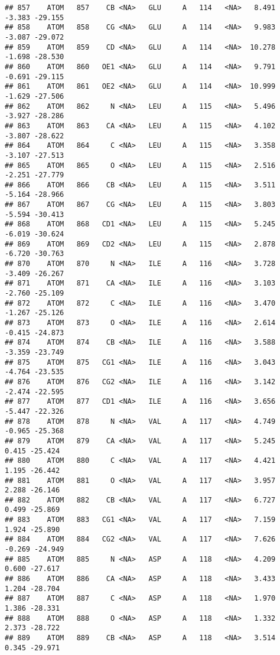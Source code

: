 \documentclass[
]{article}
\begin{document}
\begin{verbatim}
## 857    ATOM   857    CB <NA>   GLU     A   114   <NA>   8.491  -3.383 -29.155
## 858    ATOM   858    CG <NA>   GLU     A   114   <NA>   9.983  -3.087 -29.072
## 859    ATOM   859    CD <NA>   GLU     A   114   <NA>  10.278  -1.698 -28.530
## 860    ATOM   860   OE1 <NA>   GLU     A   114   <NA>   9.791  -0.691 -29.115
## 861    ATOM   861   OE2 <NA>   GLU     A   114   <NA>  10.999  -1.629 -27.506
## 862    ATOM   862     N <NA>   LEU     A   115   <NA>   5.496  -3.927 -28.286
## 863    ATOM   863    CA <NA>   LEU     A   115   <NA>   4.102  -3.807 -28.622
## 864    ATOM   864     C <NA>   LEU     A   115   <NA>   3.358  -3.107 -27.513
## 865    ATOM   865     O <NA>   LEU     A   115   <NA>   2.516  -2.251 -27.779
## 866    ATOM   866    CB <NA>   LEU     A   115   <NA>   3.511  -5.164 -28.966
## 867    ATOM   867    CG <NA>   LEU     A   115   <NA>   3.803  -5.594 -30.413
## 868    ATOM   868   CD1 <NA>   LEU     A   115   <NA>   5.245  -6.019 -30.624
## 869    ATOM   869   CD2 <NA>   LEU     A   115   <NA>   2.878  -6.720 -30.763
## 870    ATOM   870     N <NA>   ILE     A   116   <NA>   3.728  -3.409 -26.267
## 871    ATOM   871    CA <NA>   ILE     A   116   <NA>   3.103  -2.760 -25.109
## 872    ATOM   872     C <NA>   ILE     A   116   <NA>   3.470  -1.267 -25.126
## 873    ATOM   873     O <NA>   ILE     A   116   <NA>   2.614  -0.415 -24.873
## 874    ATOM   874    CB <NA>   ILE     A   116   <NA>   3.588  -3.359 -23.749
## 875    ATOM   875   CG1 <NA>   ILE     A   116   <NA>   3.043  -4.764 -23.535
## 876    ATOM   876   CG2 <NA>   ILE     A   116   <NA>   3.142  -2.474 -22.595
## 877    ATOM   877   CD1 <NA>   ILE     A   116   <NA>   3.656  -5.447 -22.326
## 878    ATOM   878     N <NA>   VAL     A   117   <NA>   4.749  -0.965 -25.368
## 879    ATOM   879    CA <NA>   VAL     A   117   <NA>   5.245   0.415 -25.424
## 880    ATOM   880     C <NA>   VAL     A   117   <NA>   4.421   1.195 -26.442
## 881    ATOM   881     O <NA>   VAL     A   117   <NA>   3.957   2.288 -26.146
## 882    ATOM   882    CB <NA>   VAL     A   117   <NA>   6.727   0.499 -25.869
## 883    ATOM   883   CG1 <NA>   VAL     A   117   <NA>   7.159   1.924 -25.890
## 884    ATOM   884   CG2 <NA>   VAL     A   117   <NA>   7.626  -0.269 -24.949
## 885    ATOM   885     N <NA>   ASP     A   118   <NA>   4.209   0.600 -27.617
## 886    ATOM   886    CA <NA>   ASP     A   118   <NA>   3.433   1.204 -28.704
## 887    ATOM   887     C <NA>   ASP     A   118   <NA>   1.970   1.386 -28.331
## 888    ATOM   888     O <NA>   ASP     A   118   <NA>   1.332   2.373 -28.722
## 889    ATOM   889    CB <NA>   ASP     A   118   <NA>   3.514   0.345 -29.971

\end{verbatim}
\end{document}
